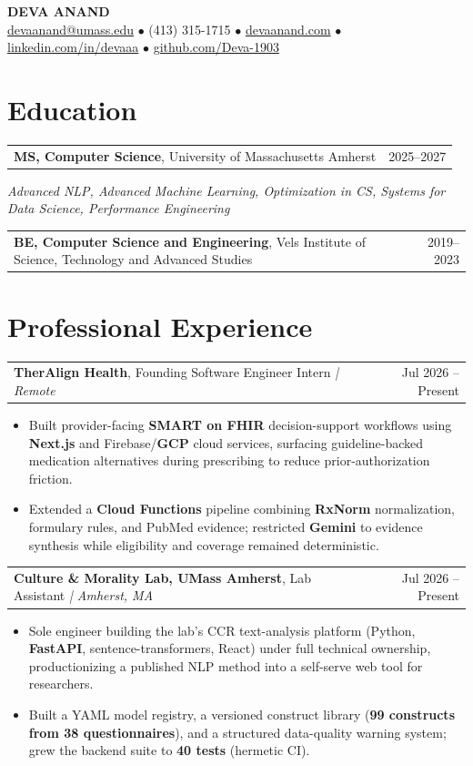 \documentclass[letterpaper,11pt]{article}
\makeatletter
\newcommand{\eduItem}[3]{%
  \begin{tabular*}{\textwidth}{@{}l@{\extracolsep{\fill}}r@{}}
    \textbf{#1}, #2 & #3 \\
  \end{tabular*}\par
}
\newcommand{\expItem}[4]{%
  \vspace{2pt}
  \begin{tabular*}{\textwidth}{@{}l@{\extracolsep{\fill}}r@{}}
    \textbf{#1}, #2 \textit{| #3} & #4 \\
  \end{tabular*}\par\vspace{-3pt}
}
\makeatother
\begin{document}
\begin{center}
    {\fontsize{18}{20}\selectfont\bfseries DEVA ANAND}\\ \vspace{3pt}
    {\small
    \href{mailto:devaanand@umass.edu}{devaanand@umass.edu}
    \enspace$\bullet$\enspace
    (413) 315-1715
    \enspace$\bullet$\enspace
    \href{https://devaanand.com}{devaanand.com}
    \enspace$\bullet$\enspace
    \href{https://linkedin.com/in/devaaa/}{linkedin.com/in/devaaa}
    \enspace$\bullet$\enspace
    \href{https://github.com/Deva-1903}{github.com/Deva-1903}}
\end{center}
\vspace{-8pt}

\section{Education}
\eduItem{MS, Computer Science}{University of Massachusetts Amherst}{2025--2027}
{\small\textit{Advanced NLP, Advanced Machine Learning, Optimization in CS, Systems for Data Science, Performance Engineering}}\par
\vspace{3pt}
\eduItem{BE, Computer Science and Engineering}{Vels Institute of Science, Technology and Advanced Studies}{2019--2023}

\section{Professional Experience}

\expItem{TherAlign Health}{Founding Software Engineer Intern}{Remote}{Jul 2026 -- Present}
\begin{itemize}
  \item Built provider-facing \textbf{SMART on FHIR} decision-support workflows using \textbf{Next.js} and Firebase/\textbf{GCP} cloud services, surfacing guideline-backed medication alternatives during prescribing to reduce prior-authorization friction.
  \item Extended a \textbf{Cloud Functions} pipeline combining \textbf{RxNorm} normalization, formulary rules, and PubMed evidence; restricted \textbf{Gemini} to evidence synthesis while eligibility and coverage remained deterministic.
\end{itemize}

\expItem{Culture \& Morality Lab, UMass Amherst}{Lab Assistant}{Amherst, MA}{Jul 2026 -- Present}
\begin{itemize}
  \item Sole engineer building the lab's CCR text-analysis platform (Python, \textbf{FastAPI}, sentence-transformers, React) under full technical ownership, productionizing a published NLP method into a self-serve web tool for researchers.
  \item Built a YAML model registry, a versioned construct library (\textbf{99 constructs from 38 questionnaires}), and a structured data-quality warning system; grew the backend suite to \textbf{40 tests} (hermetic CI).
\end{itemize}
\end{document}
